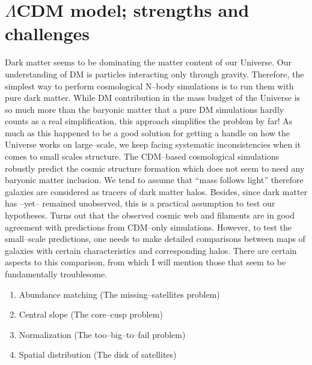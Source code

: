 \documentclass[paper=a4, fontsize=11pt]{scrartcl} %
\numberwithin{equation}{section} %
\numberwithin{figure}{section} %
\numberwithin{table}{section} %
\begin{document}
\section{$\Lambda$CDM model; strengths and challenges}
Dark matter seems to be dominating the matter content of our Universe. Our understanding of DM is particles interacting only through gravity. Therefore, the simplest way to perform cosmological N--body simulations is to run them with pure dark matter. While DM contribution in the mass budget of the Universe is so much more than the baryonic matter that a pure DM simulations hardly counts as a real simplification, this approach simplifies the problem by far! As much as this happened to be a good solution for getting a handle on how the Universe works on large--scale, we keep facing systematic inconsistencies when it comes to small scales structure. The CDM--based cosmological simulations robustly predict the cosmic structure formation which does not seem to need any baryonic matter inclusion. We tend to assume that ``mass follows light'' therefore galaxies are considered as tracers of dark matter halos. Besides, since dark matter has --yet-- remained unobserved, this is a practical assumption to test our hypotheses. Turns out that the observed cosmic web and filaments are in good agreement with predictions from CDM--only simulations. However, to test the small--scale predictions, one needs to make detailed comparisons between maps of galaxies with certain characteristics and corresponding halos. There are certain aspects to this comparison, from which I will mention those that seem to be fundamentally troublesome.
\begin{enumerate}
\item Abundance matching (The missing--satellites problem)
\item Central slope (The core--cusp problem)
\item Normalization (The too--big--to--fail problem)
\item Spatial distribution (The disk of satellites)
\end{enumerate}
\end{document}
